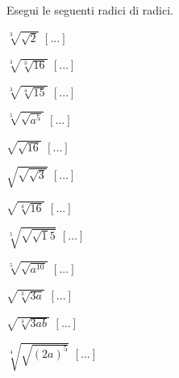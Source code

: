\begin{esercizio}[\Ast]
\begin{multicols}{4}
\begin{enumeratea}
 \end{enumeratea}
 \end{multicols}
\end{esercizio}

\begin{esercizio}[\Ast]
 \label{ese:2.48}
Esegui le seguenti radici di radici.
 \begin{multicols}{4}
 \begin{enumeratea}
 \item $\sqrt[3]{\sqrt 2}$
  \hfill $\left[...\right]$
 \item $\sqrt[3]{\sqrt[3]{16}}$
  \hfill $\left[...\right]$
 \item $\sqrt[3]{\sqrt[4]{15}}$
  \hfill $\left[...\right]$
 \item $\sqrt[5]{\sqrt{a^5}}$
  \hfill $\left[...\right]$
 \item $\sqrt{\sqrt{16}}$
  \hfill $\left[...\right]$
 \item $\sqrt{\sqrt{\sqrt 3}}$
  \hfill $\left[...\right]$
 \item $\sqrt{\sqrt[4]{16}}$
  \hfill $\left[...\right]$
 \item $\sqrt[5]{\sqrt{\sqrt 15}}$
  \hfill $\left[...\right]$
 \item $\sqrt[5]{\sqrt{a^{10}}}$
  \hfill $\left[...\right]$
 \item $\sqrt{\sqrt[3]{3a}}$
  \hfill $\left[...\right]$
 \item $\sqrt{\sqrt[4]{3ab}}$
  \hfill $\left[...\right]$
 \item $\sqrt[4]{\sqrt{(2a)^5}}$
  \hfill $\left[...\right]$
 \end{enumeratea}
 \end{multicols}
\end{esercizio}

